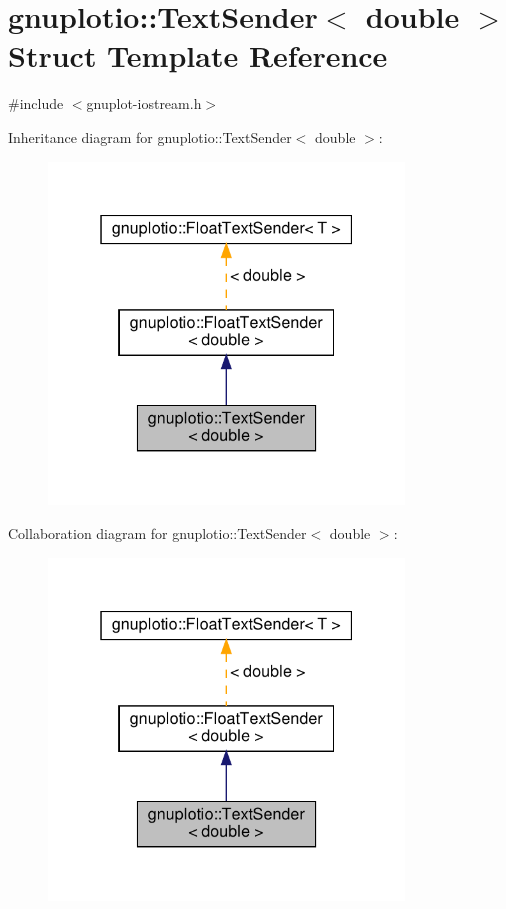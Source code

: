 \hypertarget{structgnuplotio_1_1_text_sender_3_01double_01_4}{}\section{gnuplotio\+:\+:Text\+Sender$<$ double $>$ Struct Template Reference}
\label{structgnuplotio_1_1_text_sender_3_01double_01_4}


{\ttfamily \#include $<$gnuplot-\/iostream.\+h$>$}



Inheritance diagram for gnuplotio\+:\+:Text\+Sender$<$ double $>$\+:
\nopagebreak
\begin{figure}[H]
\begin{center}
\leavevmode
\includegraphics[width=268pt]{structgnuplotio_1_1_text_sender_3_01double_01_4__inherit__graph}
\end{center}
\end{figure}


Collaboration diagram for gnuplotio\+:\+:Text\+Sender$<$ double $>$\+:
\nopagebreak
\begin{figure}[H]
\begin{center}
\leavevmode
\includegraphics[width=268pt]{structgnuplotio_1_1_text_sender_3_01double_01_4__coll__graph}
\end{center}
\end{figure}
